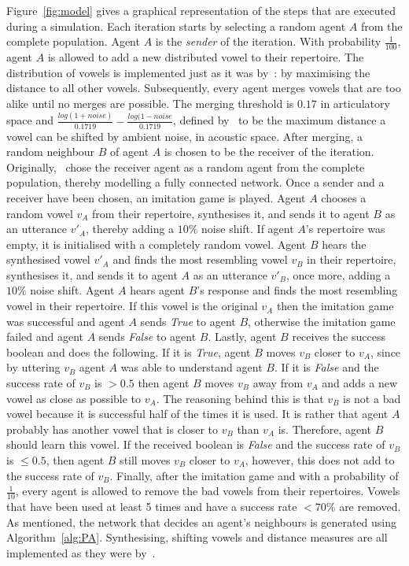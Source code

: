 \documentclass{article}
\begin{document}
Figure~\ref{fig:model} gives a graphical representation of the steps that are executed during a simulation. Each
iteration starts by selecting a random agent $A$ from the complete population. Agent $A$ is the \textit{sender} of the
iteration. With probability $\frac{1}{100}$, agent $A$ is allowed to add a new distributed vowel to their repertoire.
The distribution of vowels is implemented just as it was by~: by
maximising the distance to all other vowels. Subsequently, every agent merges vowels that are too alike until no merges
are possible. The merging threshold is $0.17$ in articulatory space and $\frac{log(1+noise)}{0.1719} -
    \frac{log(1-noise}{0.1719}$, defined by~ to be the maximum
distance
a vowel can be shifted by ambient noise, in acoustic space.
After merging, a random neighbour $B$ of agent $A$ is chosen to be the receiver of the iteration.
Originally,~ chose the receiver agent as a random agent from the
complete population, thereby modelling a fully connected network. Once a sender and a receiver have been chosen, an
imitation game is played. Agent $A$ chooses a random vowel $v_A$ from their repertoire, synthesises it, and sends it to
agent $B$ as an utterance $v'_A$, thereby adding a $10\%$ noise shift. If agent $A$'s repertoire was empty, it is
initialised with a completely random vowel. Agent $B$ hears the synthesised vowel $v'_A$ and finds the most resembling
vowel $v_B$ in their repertoire, synthesises it, and sends it to agent $A$ as an utterance $v'_B$, once more, adding a
$10\%$ noise shift. Agent $A$ hears agent $B$'s response and finds the most resembling vowel in their repertoire. If
this vowel is the original $v_A$ then the imitation game was successful and agent $A$ sends \textit{True} to agent $B$,
otherwise the imitation game failed and agent $A$ sends \textit{False} to agent $B$. Lastly, agent $B$ receives the
success boolean and does the following. If it is \textit{True}, agent $B$ moves $v_B$ closer to $v_A$, since by
uttering $v_B$ agent $A$ was able to understand agent $B$. If it is \textit{False} and the success rate of $v_B$ is $>
    0.5$ then agent $B$ moves $v_B$ away from $v_A$ and adds a new vowel as close as possible to $v_A$. The reasoning
behind this is that $v_B$ is not a bad vowel because it is successful half of the times it is used. It is rather that
agent $A$ probably has another vowel that is closer to $v_B$ than $v_A$ is. Therefore, agent $B$ should learn this
vowel. If the received boolean is \textit{False} and the success rate of $v_B$ is $\leq 0.5$, then agent $B$ still
moves $v_B$ closer to $v_A$, however, this does not add to the success rate of $v_B$. Finally, after the imitation game
and with a probability of $\frac{1}{10}$, every agent is allowed to remove the bad vowels from their repertoires.
Vowels that have been used at least 5 times and have a success rate $< 70\%$ are removed. As mentioned, the network
that decides an agent's neighbours is generated using Algorithm~\ref{alg:PA}. Synthesising, shifting vowels and
distance measures are all implemented as they were by~.
\end{document}
